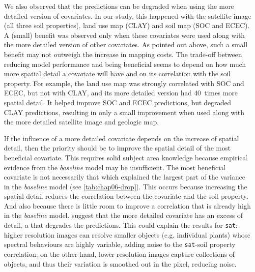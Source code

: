 We also observed that the predictions can be degraded when using the more detailed version of covariates. In 
our study, this happened with the satellite image (all three soil properties), land use map (CLAY) and soil 
map (SOC and ECEC). A (small) benefit was observed only when these covariates were used along with the more 
detailed version of other covariates. As pointed out above, such a small benefit may not outweigh the increase 
in mapping costs. The trade-off between reducing model performance and being beneficial seems to depend on how 
much more spatial detail a covariate will have and on its correlation with the soil property. For example, the 
land use map was strongly correlated with SOC and ECEC, but not with CLAY, and its more detailed version had 
\num{40}~times more spatial detail. It helped improve SOC and ECEC predictions, but degraded CLAY predictions, 
resulting in only a small improvement when used along with the more detailed satellite image and geologic map.

If the influence of a more detailed covariate depends on the increase of spatial detail, then the priority 
should be to improve the spatial detail of the most beneficial covariate. This requires solid subject area 
knowledge because empirical evidence from the \emph{baseline} model may be insufficient. The most beneficial 
covariate is not necessarily that which explained the largest part of the variance in the \emph{baseline} 
model (see \autoref{tab:chap06-drop}). This occurs because increasing the spatial detail reduces the 
correlation between the covariate and the soil property. And also because there is little room to improve a 
correlation that is already high in the \emph{baseline} model. \citet{CavazziEtAl2013} suggest that the 
more detailed covariate has an excess of detail, a  that degrades the predictions. This could explain 
the results for \texttt{sat}: higher resolution images can resolve smaller objects (e.g. individual plants) 
whose spectral behaviours are highly variable, adding noise to the \texttt{sat}-soil property correlation; on 
the other hand, lower resolution images capture collections of objects, and thus their variation is smoothed 
out in the pixel, reducing noise.

